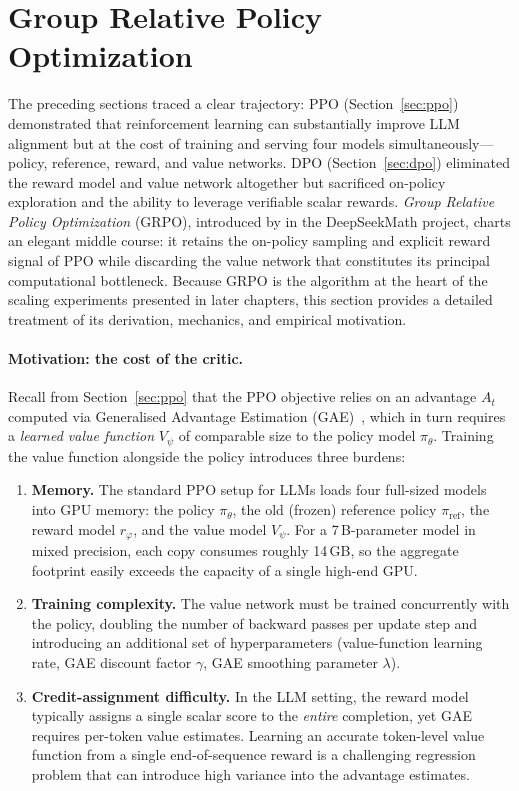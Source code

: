 \section{Group Relative Policy Optimization}
\label{sec:grpo}

The preceding sections traced a clear trajectory: PPO
(Section~\ref{sec:ppo}) demonstrated that reinforcement learning can
substantially improve LLM alignment but at the cost of training and serving
four models simultaneously---policy, reference, reward, and value networks.
DPO (Section~\ref{sec:dpo}) eliminated the reward model and value network
altogether but sacrificed on-policy exploration and the ability to leverage
verifiable scalar rewards.  \emph{Group Relative Policy Optimization}
(GRPO), introduced by \cite{shao2024deepseekmath} in the DeepSeekMath
project, charts an elegant middle course: it retains the on-policy sampling
and explicit reward signal of PPO while discarding the value network that
constitutes its principal computational bottleneck.  Because GRPO is the
algorithm at the heart of the scaling experiments presented in later
chapters, this section provides a detailed treatment of its derivation,
mechanics, and empirical motivation.

\paragraph{Motivation: the cost of the critic.}
Recall from Section~\ref{sec:ppo} that the PPO objective relies on an
advantage $A_t$ computed via Generalised Advantage Estimation
(GAE)~\cite{schulman2017ppo}, which in turn requires a \emph{learned value
function} $V_\psi$ of comparable size to the policy model $\pi_\theta$.
Training the value function alongside the policy introduces three
burdens:
\begin{enumerate}[leftmargin=1.8em,itemsep=2pt]
\item \textbf{Memory.}  The standard PPO setup for LLMs loads four
      full-sized models into GPU memory: the policy $\pi_\theta$, the old
      (frozen) reference policy $\pi_{\text{ref}}$, the reward model
      $r_\varphi$, and the value model $V_\psi$.  For a 7\,B-parameter
      model in mixed precision, each copy consumes roughly 14\,GB, so the
      aggregate footprint easily exceeds the capacity of a single
      high-end GPU.
\item \textbf{Training complexity.}  The value network must be trained
      concurrently with the policy, doubling the number of backward passes
      per update step and introducing an additional set of hyperparameters
      (value-function learning rate, GAE discount factor $\gamma$, GAE
      smoothing parameter $\lambda$).
\item \textbf{Credit-assignment difficulty.}  In the LLM setting, the
      reward model typically assigns a single scalar score to the
      \emph{entire} completion, yet GAE requires per-token value
      estimates.  Learning an accurate token-level value function from a
      single end-of-sequence reward is a challenging regression problem
      that can introduce high variance into the advantage estimates.
\end{enumerate}

